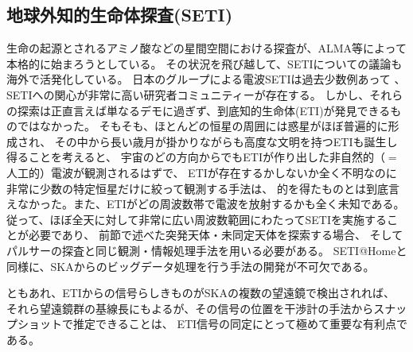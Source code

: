 \setcounter{subsection}{6}\subsection{地球外知的生命体探査(SETI)}\label{c7.s4.ss7}

生命の起源とされるアミノ酸などの星間空間における探査が、ALMA等によって本格的に始まろうとしている。
その状況を飛び越して、SETIについての議論も海外で活発化している。
日本のグループによる電波SETIは過去少数例あって\citep{1978Natur.276..694M,2004IAUS..213..423S} 、
SETIへの関心が非常に高い研究者コミュニティーが存在する。
しかし、それらの探索は正直言えば単なるデモに過ぎず、到底知的生命体(ETI)が発見できるものではなかった。
そもそも、ほとんどの恒星の周囲には惑星がほぼ普遍的に形成され、
その中から長い歳月が掛かりながらも高度な文明を持つETIも誕生し得ることを考えると、
宇宙のどの方向からでもETIが作り出した非自然的（$=$人工的）電波が観測されるはずで、
ETIが存在するかしないか全く不明なのに非常に少数の特定恒星だけに絞って観測する手法は、
的を得たものとは到底言えなかった。また、ETIがどの周波数帯で電波を放射するかも全く未知である。
従って、ほぼ全天に対して非常に広い周波数範囲にわたってSETIを実施することが必要であり、
前節で述べた突発天体・未同定天体を探索する場合、
そしてパルサーの探査と同じ観測・情報処理手法を用いる必要がある。
SETI@Homeと同様に、SKAからのビッグデータ処理を行う手法の開発が不可欠である。

ともあれ、ETIからの信号らしきものがSKAの複数の望遠鏡で検出されれば、
それら望遠鏡群の基線長にもよるが、その信号の位置を干渉計の手法からスナップショットで推定できることは、
ETI信号の同定にとって極めて重要な有利点である。


